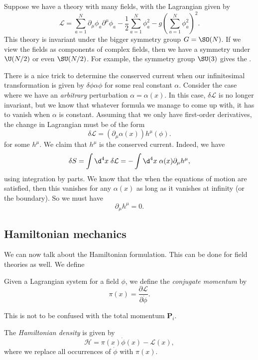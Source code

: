 \documentclass[a4paper]{article}
\begin{document}
\begin{eg}
  Suppose we have a theory with many fields, with the Lagrangian given by
  \[
    \mathcal{L} = \sum_{a = 1}^N \partial_\mu \phi_a \partial^\mu \phi_a - \frac{1}{2} \sum_{a = 1}^N \phi_a^2 - g \left(\sum_{a = 1}^N \phi_a^2\right)^2.
  \]
  This theory is invariant under the bigger symmetry group $G = \SO(N)$. If we view the fields as components of complex fields, then we have a symmetry under $\U(N/2)$ or even $\SU(N/2)$. For example, the symmetry group $\SU(3)$ gives the .
\end{eg}

\begin{eg}
  There is a nice trick to determine the conserved current when our infinitesimal transformation is given by $\delta \phi \alpha \phi$ for some real constant $\alpha$. Consider the case where we have an \emph{arbitrary} perturbation $\alpha = \alpha(x)$. In this case, $\delta\mathcal{L}$ is no longer invariant, but we know that whatever formula we manage to come up with, it has to vanish when $\alpha$ is constant. Assuming that we only have first-order derivatives, the change in Lagrangian must be of the form
  \[
    \delta \mathcal{L} = (\partial_\mu \alpha(x)) h^\mu(\phi).
  \]
  for some $h^\mu$. We claim that $h^\mu$ is the conserved current. Indeed, we have
  \[
    \delta S = \int \d^4 x\; \delta \mathcal{L} = - \int \d^4 x\; \alpha(x) \partial_\mu h^\mu,
  \]
  using integration by parts. We know that the when the equations of motion are satisfied, then this vanishes for any $\alpha(x)$ as long as it vanishes at infinity (or the boundary). So we must have
  \[
    \partial_\mu h^\mu = 0.
  \]
\end{eg}

\subsection{Hamiltonian mechanics}
We can now talk about the Hamiltonian formulation. This can be done for field theories as well. We define
\begin{defi}
  Given a Lagrangian system for a field $\phi$, we define the \emph{conjugate momentum} by
  \[
    \pi(x) = \frac{\partial \mathcal{L}}{\partial \dot{\phi}}.
  \]
\end{defi}
This is not to be confused with the total momentum $\mathbf{P}_i$.

\begin{defi}
  The \emph{Hamiltonian density} is given by
  \[
    \mathcal{H} = \pi(x) \dot{\phi}(x) - \mathcal{L}(x),
  \]
  where we replace all occurrences of $\dot{\phi}$ with $\pi(x)$.
\end{defi}
\end{document}

